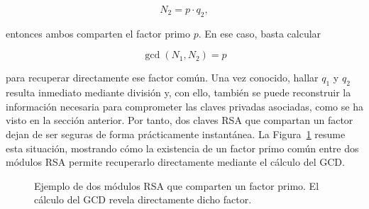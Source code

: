 \[
N_2 = p \cdot q_2,
\]

entonces ambos comparten el factor primo \(p\). En ese caso, basta calcular

\[
\gcd(N_1,N_2)=p
\]

para recuperar directamente ese factor común. Una vez conocido, hallar \(q_1\) y \(q_2\) resulta inmediato mediante división y, con ello, también se puede reconstruir la información necesaria para comprometer las claves privadas asociadas, como se ha visto en la sección anterior. Por tanto, dos claves RSA que compartan un factor dejan de ser seguras de forma prácticamente instantánea. La Figura~\ref{fig:factor_compartido} resume esta situación, mostrando cómo la existencia de un factor primo común entre dos módulos RSA permite recuperarlo directamente mediante el cálculo del GCD.

\begin{figure}[H]
    \centering
    \caption{Ejemplo de dos módulos RSA que comparten un factor primo. El cálculo del GCD revela directamente dicho factor.}
    \label{fig:factor_compartido}
\end{figure}

